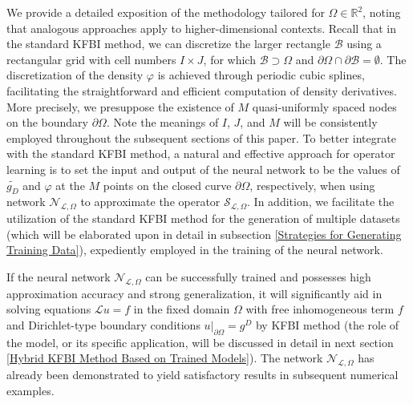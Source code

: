 \documentclass{article}
\newcommand{\R}{\mathbb{R}}
\begin{document}
We provide a detailed exposition of the methodology tailored for $\Omega \in \R^2$, noting that analogous approaches apply to higher-dimensional contexts. Recall that in the standard KFBI method, we can discretize the larger rectangle $\mathcal{B}$ using a rectangular grid with cell numbers $I \times J$, for which $\mathcal{B} \supset \Omega$ and $\partial\Omega\cap\partial\mathcal{B}=\emptyset$. The discretization of the density $\varphi$ is achieved through periodic cubic splines, facilitating the straightforward and efficient computation of density derivatives. More precisely, we presuppose the existence of $M$ quasi-uniformly spaced nodes on the boundary $\partial \Omega$. Note the meanings of \(I\), \(J\), and \(M\) will be consistently employed throughout the subsequent sections of this paper. To better integrate with the standard KFBI method, a natural and effective approach for operator learning is to set the input and output of the neural network to be the values of $\widetilde{g_D}$ and $\varphi$ at the $M$ points on the closed curve $\partial \Omega$, respectively, when using network $\mathcal{N}_{\mathcal{L}, \Omega}$ to approximate the operator $\mathcal{S}_{\mathcal{L}, \Omega}$. In addition, we facilitate the utilization of the standard KFBI method for the generation of multiple datasets (which will be elaborated upon in detail in subsection \ref{Strategies for Generating Training Data}), expediently employed in the training of the neural network.

If the neural network $\mathcal{N}_{\mathcal{L}, \Omega}$ can be successfully trained and possesses high approximation accuracy and strong generalization, it will significantly aid in solving equations $\mathcal{L} u = f$ in the fixed domain \(\Omega\) with free inhomogeneous term $f$ and Dirichlet-type boundary conditions $u|_{\partial \Omega} = g^D$ by KFBI method (the role of the model, or its specific application, will be discussed in detail in next section \ref{Hybrid KFBI Method Based on Trained Models}). The network $\mathcal{N}_{\mathcal{L}, \Omega}$ has already been demonstrated to yield satisfactory results in subsequent numerical examples. 
\end{document}
